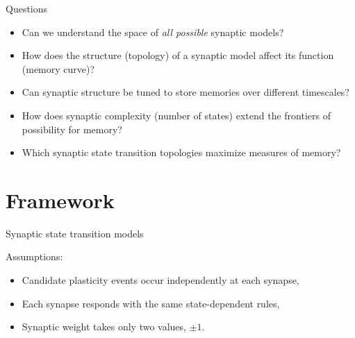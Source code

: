 \documentclass[final,hyperref={pdfpagelabels=false,bookmarks=false}]{beamer}
\newcommand{\pot}{^\text{pot}}
\newcommand{\dep}{^\text{dep}}
\newcommand{\frg}{^\text{forget}}
\newcommand{\eq}{\mathbf{p}^\infty}
\newcommand{\M}{\mathbf{M}}
\begin{document}
\begin{frame}{}
\begin{columns}[t]
\begin{column}{0.33\linewidth}
\begin{block}{Questions}
%
 \begin{itemize}
   \item Can we understand the space of \emph{all possible} synaptic models?
   \item How does the structure (topology) of a synaptic model affect its function (memory curve)?
   \item Can synaptic structure be tuned to store memories over different timescales?
   \item How does synaptic complexity (number of states) extend the frontiers of possibility for memory?
   \item Which synaptic state transition topologies maximize measures of memory?
 \end{itemize}
%
\end{block}


\section{Framework}


\begin{block}{Synaptic state transition models}
%
%
%
\parbox[c]{0.4\linewidth}{
}%
%
%
%
\parbox[c]{0.59\linewidth}{Assumptions:
\begin{itemize}
  \item Candidate plasticity events occur independently at each synapse,
  \item Each synapse responds with the same state-dependent rules,
  \item Synaptic weight takes only two values, $\pm1$.
 \end{itemize}
 }


\end{block}
\end{column}
\end{columns}
\end{frame}
\end{document}

